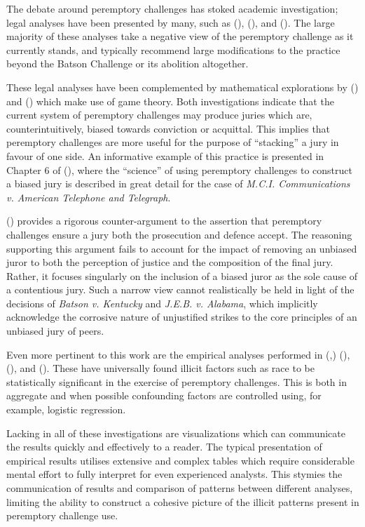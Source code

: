 The debate around peremptory challenges has stoked academic investigation; legal analyses have been
presented by many, such as (\cite{hoffman1997}), (\cite{broderick1992}), and (\cite{Nunn1993}). The large majority of these
analyses take a negative view of the peremptory challenge as it currently stands, and typically recommend large
modifications to the practice beyond the Batson Challenge or its abolition altogether.

These legal analyses have been complemented by mathematical explorations by (\cite{ford2010}) and (\cite{flanagan2015}) which make use of game
theory. Both investigations indicate that the current system of peremptory challenges may produce juries which are, counterintuitively, biased
towards conviction or acquittal. This implies that peremptory challenges are more useful for the purpose of ``stacking'' a jury in favour of one side. An informative example of this practice is presented in  Chapter 6 of (\cite{hansvidjudging}), where the ``science'' of using peremptory challenges to construct a biased jury is described in great detail for the case of \textit{M.C.I. Communications v. American Telephone and Telegraph}.

(\cite{hoffman1997}) provides a rigorous counter-argument to the assertion that peremptory challenges ensure a jury both the prosecution and defence accept. The reasoning supporting this argument fails to account for the
impact of removing an unbiased juror to both the perception of justice and the composition of the final jury. Rather, it focuses
singularly on the inclusion of a biased juror as the sole cause of a contentious jury. Such a narrow view cannot
realistically be held in light of the decisions of \textit{Batson v. Kentucky} and \textit{J.E.B. v. Alabama}, which implicitly
acknowledge the corrosive nature of unjustified strikes to the core principles of an unbiased jury of peers.

Even more pertinent to this work are the empirical analyses performed in (\cite{PerempChalMurder},) (\cite{JurySunshineProj}),
(\cite{StubbornLegacy}), and (\cite{baldus2012}). These have
universally found illicit factors such as race to be statistically significant in
the exercise of peremptory challenges. This is both in aggregate and when possible confounding factors are controlled using, for example,
logistic regression. 

Lacking in all of these investigations are visualizations which can
communicate the results quickly and effectively to a reader. The typical presentation of empirical results utilises extensive and complex tables which require considerable mental effort to fully interpret for even experienced analysts. This stymies the communication of results and comparison of patterns between different analyses, limiting the ability to construct a cohesive picture of the illicit patterns present in peremptory challenge use.
